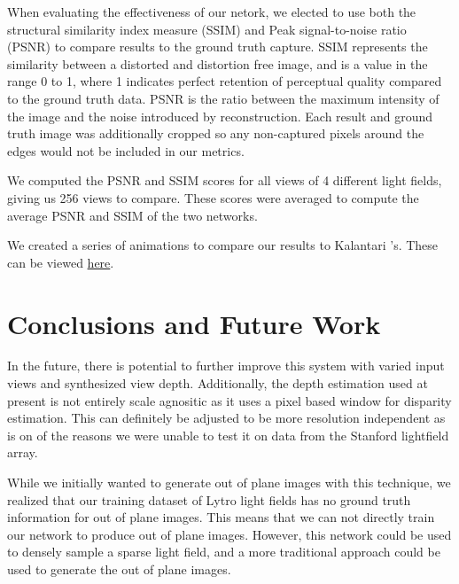 \documentclass[10pt,twocolumn,letterpaper]{article}
\begin{document}
When evaluating the effectiveness of our netork, we elected to use both the structural similarity index measure (SSIM)
and Peak signal-to-noise ratio (PSNR) to compare results to the ground truth capture. SSIM represents the similarity
between a distorted and distortion free image, and is a value in the range 0 to 1, where 1 indicates perfect retention
of perceptual quality compared to the ground truth data. PSNR is the ratio between the maximum intensity of the image
and the noise introduced by reconstruction. Each result and ground truth image was additionally cropped so any
non-captured pixels around the edges would not be included in our metrics.

We computed the PSNR and SSIM scores for all views of 4 different light fields, giving us 256 views to compare.
These scores were averaged to compute the average PSNR and SSIM of the two networks. 


We created a series of animations to compare our results to Kalantari \etal's. These can be viewed 
\href{https://drive.google.com/drive/folders/1DDbB1v1vbq7zsg3srJPDKFlI9H7mGEmC?usp=sharing}{here}.

\section{Conclusions and Future Work}

In the future, there is potential to further improve this system with varied input views and synthesized
view depth. Additionally, the depth estimation used at present is not entirely scale agnositic as it
uses a pixel based window for disparity estimation. This can definitely be adjusted to be more resolution
independent as is on of the reasons we were unable to test it on data from the Stanford lightfield array.

While we initially wanted to generate out of plane images with this technique, we realized that our training dataset
of Lytro light fields has no ground truth information for out of plane images. This means that we can not directly
train our network to produce out of plane images. However, this network could be used to densely sample a sparse light field,
and a more traditional approach could be used to generate the out of plane images.


{\small


}
\end{document}
